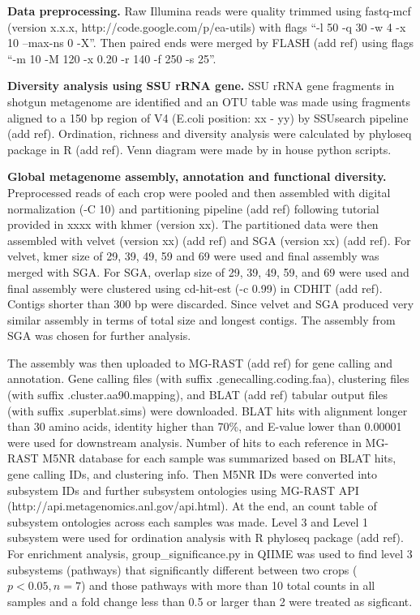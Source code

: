\documentclass[12pt]{article}
\begin{document}
{\bf Data preprocessing.}
Raw Illumina reads were quality trimmed using fastq-mcf (version x.x.x, http://code.google.com/p/ea-utils) with flags ``-l 50 -q 30 -w 4 -x 10 --max-ns 0 -X''. Then paired ends were merged by FLASH (add ref) using flags ``-m 10 -M 120 -x 0.20 -r 140 -f 250 -s 25''.

{\bf Diversity analysis using SSU rRNA gene.}
SSU rRNA gene fragments in shotgun metagenome are identified and an OTU table was made using fragments aligned to a 150 bp region of V4 (E.coli position: xx - yy) by SSUsearch pipeline (add ref). Ordination, richness and diversity analysis were calculated by phyloseq package in R (add ref). Venn diagram were made by in house python scripts.

{\bf Global metagenome assembly, annotation and functional diversity.}
Preprocessed reads of each crop were pooled and then assembled with digital normalization (-C 10) and partitioning pipeline (add ref) following tutorial provided in xxxx with khmer (version xx). The partitioned data were then assembled with velvet (version xx) (add ref) and SGA (version xx) (add ref). For velvet, kmer size of 29, 39, 49, 59 and 69 were used and final assembly was merged with SGA. For SGA, overlap size of 29, 39, 49, 59, and 69 were used and final assembly were clustered using cd-hit-est (-c 0.99) in CDHIT (add ref). Contigs shorter than 300 bp were discarded. Since velvet and SGA produced very similar assembly in terms of total size and longest contigs. The assembly from SGA was chosen for further analysis.

The assembly was then uploaded to MG-RAST (add ref) for gene calling and annotation. Gene calling files (with suffix .genecalling.coding.faa), clustering files (with suffix .cluster.aa90.mapping), and BLAT (add ref) tabular output files (with suffix .superblat.sims) were downloaded. BLAT hits with alignment longer than 30 amino acids, identity higher than 70\%, and E-value lower than 0.00001 were used for downstream analysis. Number of hits to each reference in MG-RAST M5NR database for each sample was summarized based on BLAT hits, gene calling IDs, and clustering info. Then M5NR IDs were converted into subsystem IDs and further subsystem ontologies using MG-RAST API (http://api.metagenomics.anl.gov/api.html). At the end, an count table of subsystem ontologies across each samples was made. Level 3 and Level 1 subsystem were used for ordination analysis with R phyloseq package (add ref). For enrichment analysis, group\_significance.py in QIIME was used to find level 3 subsystems (pathways) that significantly different between two crops ($p < 0.05, n = 7$) and those pathways with more than 10 total counts in all samples and a fold change less than 0.5 or larger than 2 were treated as sigficant.
\end{document}
